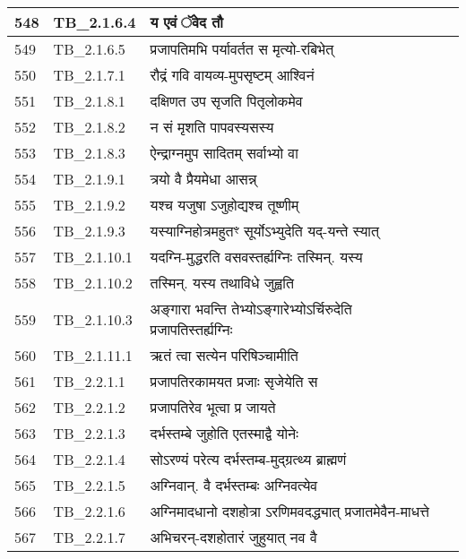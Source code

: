 \documentclass[17pt]{extarticle}
\begin{document}
\begin{longtable}{||p{0.4in}||p{0.9in}||p{4.0in}||p{0.9in}||}
        \hline
            548 & TB\_2.1.6.4 & य एवं ॅवेद तौ &      \\
        \hline
            549 & TB\_2.1.6.5 & प्रजापतिमभि पर्यावर्तत स मृत्यो{-}रबिभेत् &      \\
        \hline
            550 & TB\_2.1.7.1 & रौद्रं गवि वायव्य{-}मुपसृष्टम् आश्विनं &      \\
        \hline
            551 & TB\_2.1.8.1 & दक्षिणत उप सृजति पितृलोकमेव &      \\
        \hline
            552 & TB\_2.1.8.2 & न सं मृशति पापवस्यसस्य &      \\
        \hline
            553 & TB\_2.1.8.3 & ऐन्द्राग्नमुप सादितम् सर्वाभ्यो वा &      \\
        \hline
            554 & TB\_2.1.9.1 & त्रयो वै प्रैयमेधा आसन्न् &      \\
        \hline
            555 & TB\_2.1.9.2 & यश्च यजुषा ऽजुहोद्यश्च तूष्णीम् &      \\
        \hline
            556 & TB\_2.1.9.3 & यस्याग्निहोत्रमहुतꣳ सूर्योऽभ्युदेति यद्{-}यन्ते स्यात् &      \\
        \hline
            557 & TB\_2.1.10.1 & यदग्नि{-}मुद्धरति वसवस्तर्ह्यग्निः तस्मिन्. यस्य &      \\
        \hline
            558 & TB\_2.1.10.2 & तस्मिन्. यस्य तथाविधे जुह्वति &      \\
        \hline
            559 & TB\_2.1.10.3 & अङ्गारा भवन्ति तेभ्योऽङ्गारेभ्योऽर्चिरुदेति प्रजापतिस्तर्ह्यग्निः &      \\
        \hline
            560 & TB\_2.1.11.1 & ऋतं त्वा सत्येन परिषिञ्चामीति &      \\
        \hline
            561 & TB\_2.2.1.1 & प्रजापतिरकामयत प्रजाः सृजेयेति स &      \\
        \hline
            562 & TB\_2.2.1.2 & प्रजापतिरेव भूत्वा प्र जायते &      \\
        \hline
            563 & TB\_2.2.1.3 & दर्भस्तम्बे जुहोति एतस्माद्वै योनेः &      \\
        \hline
            564 & TB\_2.2.1.4 & सोऽरण्यं परेत्य दर्भस्तम्ब{-}मुद्ग्रत्थ्य ब्राह्मणं &      \\
        \hline
            565 & TB\_2.2.1.5 & अग्निवान्. वै दर्भस्तम्बः अग्निवत्येव &      \\
        \hline
            566 & TB\_2.2.1.6 & अग्निमादधानो दशहोत्रा ऽरणिमवदद्ध्यात् प्रजातमेवैन{-}माधत्ते &      \\
        \hline
            567 & TB\_2.2.1.7 & अभिचरन्{-}दशहोतारं जुहुयात् नव वै &      \\

\end{longtable}
\end{document}
